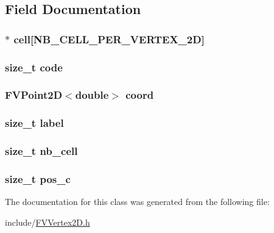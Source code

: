 \subsection{Field Documentation}
\hypertarget{classFVVertex2D_a2e88df41fb480687d9c7ed51db6f0226}{
\subsubsection[{cell}]{$\ast$ {\bf cell}\mbox{[}NB\_\-CELL\_\-PER\_\-VERTEX\_\-2D\mbox{]}}}
\label{d5/dbb/classFVVertex2D_a2e88df41fb480687d9c7ed51db6f0226}
\hypertarget{classFVVertex2D_acf258c3b3328a96e3ee1e3b875b7874f}{
\subsubsection[{code}]{\setlength{\rightskip}{0pt plus 5cm}size\_\-t {\bf code}}}
\label{d5/dbb/classFVVertex2D_acf258c3b3328a96e3ee1e3b875b7874f}
\hypertarget{classFVVertex2D_a7df51306f5a4f82e51aec0d168ce5ac2}{
\subsubsection[{coord}]{\setlength{\rightskip}{0pt plus 5cm}FVPoint2D$<$double$>$ {\bf coord}}}
\label{d5/dbb/classFVVertex2D_a7df51306f5a4f82e51aec0d168ce5ac2}
\hypertarget{classFVVertex2D_a1ec973463c76e6d9e91160720959ad68}{
\subsubsection[{label}]{\setlength{\rightskip}{0pt plus 5cm}size\_\-t {\bf label}}}
\label{d5/dbb/classFVVertex2D_a1ec973463c76e6d9e91160720959ad68}
\hypertarget{classFVVertex2D_a1a5a11cfc8bbaa0cf132759c0382da70}{
\subsubsection[{nb\_\-cell}]{\setlength{\rightskip}{0pt plus 5cm}size\_\-t {\bf nb\_\-cell}}}
\label{d5/dbb/classFVVertex2D_a1a5a11cfc8bbaa0cf132759c0382da70}
\hypertarget{classFVVertex2D_a4a8207cde821dc3afcfb83f8645d62ef}{
\subsubsection[{pos\_\-c}]{\setlength{\rightskip}{0pt plus 5cm}size\_\-t {\bf pos\_\-c}}}
\label{d5/dbb/classFVVertex2D_a4a8207cde821dc3afcfb83f8645d62ef}


The documentation for this class was generated from the following file:\begin{DoxyCompactItemize}
\item 
include/\hyperlink{FVVertex2D_8h}{FVVertex2D.h}\end{DoxyCompactItemize}
